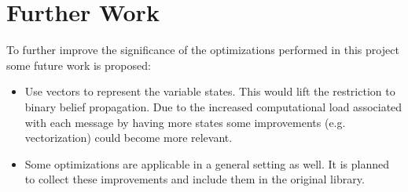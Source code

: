 
\section{Further Work}
To further improve the significance of the optimizations performed in this project some future work is proposed:

\begin{itemize}
\item Use vectors to represent the variable states. This would lift the restriction to binary belief propagation. Due to the increased computational load associated with each message by having more states some improvements (e.g. vectorization) could become more relevant.
\item Some optimizations are applicable in a general setting as well. It is planned to collect these improvements and include them in the original library.
\end{itemize}


